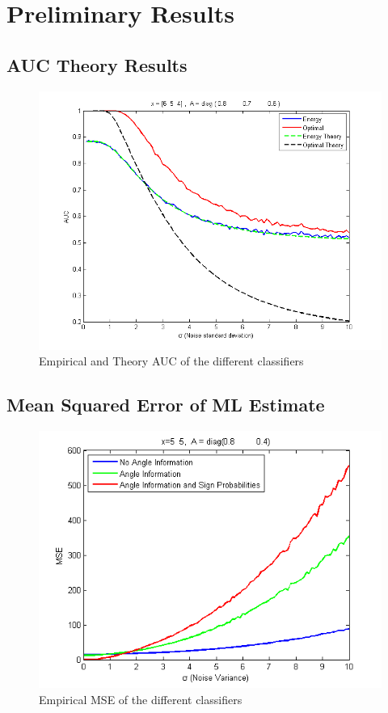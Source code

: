 \documentclass[english]{article}
\begin{document}
\section{Preliminary Results}

\subsection{AUC Theory Results}
\begin{figure}[h!]
\centering
\includegraphics[width=5in]{with_theory.png}
\caption{Empirical and Theory AUC of the different classifiers}
\label{fig:theory_1}
\end{figure}

\subsection{Mean Squared Error of ML Estimate}

\begin{figure}[h!]
\centering
\includegraphics[width=5in]{mse_1.png}
\caption{Empirical MSE of the different classifiers}
\label{fig:mse_1}
\end{figure}
\end{document}
